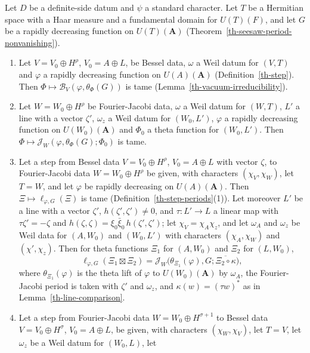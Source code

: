 \begin{lemma}\label{th-step-functionals}
Let $D$ be a definite-side datum and $\psi$ a standard character. Let $T$ be a
Hermitian space with a Haar measure and a fundamental domain for $U(T)(F)$, and
let $G$ be a rapidly decreasing function on $U(T)(\mathbf A)$
(Theorem~\ref{th-seesaw-period-nonvanishing}).
\begin{enumerate}
\item Let $V=V_0\oplus H^\rho$, $V_0=A\oplus L$, be Bessel data, $\omega$ a Weil
  datum for $(V,T)$ and $\varphi$ a rapidly decreasing function on
  $U(A)(\mathbf A)$ (Definition~\ref{th-step}). Then
  $\Phi\mapsto\mathcal B_V(\varphi,\theta_\Phi(G))$ is tame
  (Lemma~\ref{th-vacuum-irreducibility}).
\item Let $W=W_0\oplus H^\rho$ be Fourier-Jacobi data, $\omega$ a Weil datum for
  $(W,T)$, $L'$ a line with a vector $\zeta'$, $\omega_z$ a Weil datum for
  $(W_0,L')$, $\varphi$ a rapidly decreasing function on $U(W_0)(\mathbf A)$ and
  $\Phi_0$ a theta function for $(W_0,L')$. Then
  $\Phi\mapsto\mathcal J_W(\varphi,\theta_\Phi(G);\Phi_0)$ is tame.
\item Let a step from Bessel data $V=V_0\oplus H^\rho$, $V_0=A\oplus L$ with
  vector $\zeta$, to Fourier-Jacobi data $W=W_0\oplus H^\rho$ be given, with
  characters $(\chi_V,\chi_W)$, let $T=W$, and let $\varphi$ be rapidly
  decreasing on $U(A)(\mathbf A)$. Then $\Xi\mapsto\ell_{\varphi,G}(\Xi)$ is tame
  (Definition~\ref{th-step-periods}(1)). Let moreover $L'$ be a line with a
  vector $\zeta'$, $h(\zeta',\zeta')\neq0$, and $\tau\colon L'\to L$ a linear
  map with $\tau\zeta'=-\zeta$ and
  $h(\zeta,\zeta)=\xi_0\bar\xi_0\,h(\zeta',\zeta')$; let
  $\chi_V=\chi_A\chi_z$, and let $\omega_A$ and $\omega_z$ be Weil data for
  $(A,W_0)$ and $(W_0,L')$ with characters $(\chi_A,\chi_W)$ and
  $(\chi',\chi_z)$. Then for theta functions $\Xi_1$ for $(A,W_0)$ and $\Xi_2$
  for $(L,W_0)$,
  \[
  \ell_{\varphi,G}(\Xi_1\boxtimes\Xi_2)=\mathcal J_W\bigl(\theta_{\Xi_1}(\varphi),G;\overline{\Xi_2\circ\kappa}\bigr),
  \]
  where $\theta_{\Xi_1}(\varphi)$ is the theta lift of $\varphi$ to
  $U(W_0)(\mathbf A)$ by $\omega_A$, the Fourier-Jacobi period is taken with
  $\zeta'$ and $\omega_z$, and $\kappa(w)=(\tau w)^*$ as in
  Lemma~\ref{th-line-comparison}.
\item Let a step from Fourier-Jacobi data $W=W_0\oplus H^{\sigma+1}$ to Bessel
  data $V=V_0\oplus H^\sigma$, $V_0=A\oplus L$, be given, with characters
  $(\chi_W,\chi_V)$, let $T=V$, let $\omega_z$ be a Weil datum for $(W_0,L)$, let

\end{enumerate}
\end{lemma}
